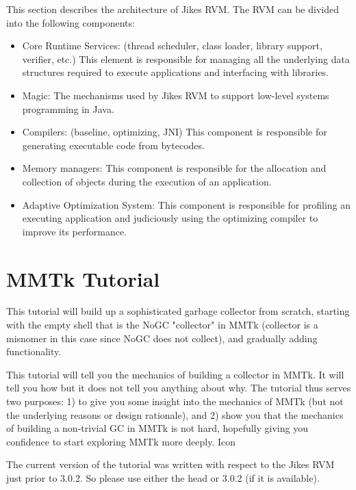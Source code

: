 \documentclass[a4paper]{book}
\begin{document}
This section describes the architecture of Jikes RVM. The RVM can be divided into the following components:

\begin{itemize}
  \item Core Runtime Services: (thread scheduler, class loader, library support, verifier, etc.) This element is responsible for managing all the underlying data structures required to execute applications and interfacing with libraries.
  \item Magic: The mechanisms used by Jikes RVM to support low-level systems programming in Java.
  \item Compilers: (baseline, optimizing, JNI) This component is responsible for generating executable code from bytecodes.
  \item Memory managers: This component is responsible for the allocation and collection of objects during the execution of an application.
  \item Adaptive Optimization System: This component is responsible for profiling an executing application and judiciously using the optimizing compiler to improve its performance.
\end{itemize}













\chapter{MMTk Tutorial}


This tutorial will build up a sophisticated garbage collector from scratch, starting with the empty shell that is the NoGC "collector" in MMTk (collector is a misnomer in this case since NoGC does not collect), and gradually adding functionality.

This tutorial will tell you the mechanics of building a collector in MMTk. It will tell you how but it does not tell you anything about why. The tutorial thus serves two purposes: 1) to give you some insight into the mechanics of MMTk (but not the underlying reasons or design rationale), and 2) show you that the mechanics of building a non-trivial GC in MMTk is not hard, hopefully giving you confidence to start exploring MMTk more deeply.
Icon

The current version of the tutorial was written with respect to the Jikes RVM just prior to 3.0.2. So please use either the head or 3.0.2 (if it is available).
\end{document}
